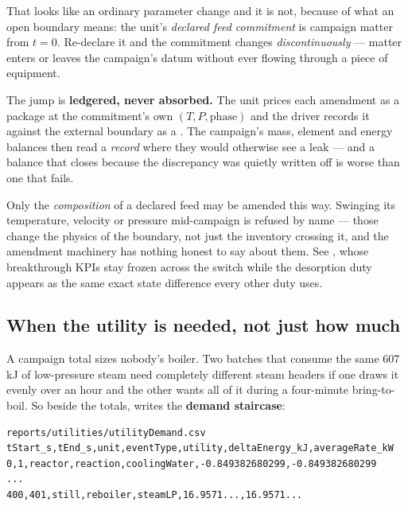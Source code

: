 \documentclass[11pt,a4paper]{article}
\begin{document}
That looks like an ordinary parameter change and it is not, because of
what an open boundary means: the unit's \emph{declared feed commitment} is
campaign matter from $t = 0$.  Re-declare it and the commitment changes
\emph{discontinuously} --- matter enters or leaves the campaign's datum
without ever flowing through a piece of equipment.

\begin{keyidea}
The jump is \textbf{ledgered, never absorbed.}  The unit prices each
amendment as a package at the commitment's own $(T, P, \text{phase})$ and
the driver records it against the external boundary as a
.  The campaign's mass, element and energy balances
then read a \emph{record} where they would otherwise see a leak --- and a
balance that closes because the discrepancy was quietly written off is
worse than one that fails.
\end{keyidea}

\begin{pitfall}
Only the \emph{composition} of a declared feed may be amended this way.
Swinging its temperature, velocity or pressure mid-campaign is refused by
name --- those change the physics of the boundary, not just the inventory
crossing it, and the amendment machinery has nothing honest to say about
them.  See , whose breakthrough KPIs
stay frozen across the switch while the desorption duty appears as the
same exact state difference every other duty uses.
\end{pitfall}

\subsection{When the utility is needed, not just how much}\label{sec:utility-demand}

A campaign total sizes nobody's boiler.  Two batches that consume the same
607\,kJ of low-pressure steam need completely different steam headers if one
draws it evenly over an hour and the other wants all of it during a
four-minute bring-to-boil.  So beside the totals,  writes
the \textbf{demand staircase}:

\begin{lstlisting}
reports/utilities/utilityDemand.csv
tStart_s,tEnd_s,unit,eventType,utility,deltaEnergy_kJ,averageRate_kW
0,1,reactor,reaction,coolingWater,-0.849382680299,-0.849382680299
...
400,401,still,reboiler,steamLP,16.9571...,16.9571...
\end{lstlisting}
\end{document}
